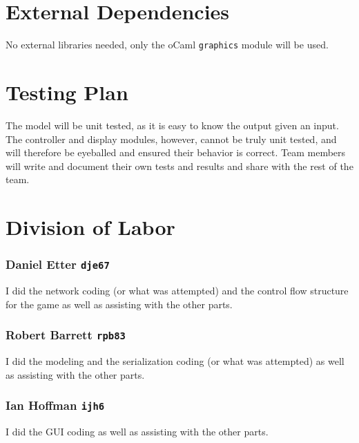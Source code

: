 \documentclass[10pt]{article}
\begin{document}
\clearpage
\part*{External Dependencies}
No external libraries needed, only the oCaml \texttt{graphics} module will be used.

\part*{Testing Plan}
The model will be unit tested, as it is easy to know the output given an input. The controller and display modules, however, cannot be truly unit tested, and will therefore be eyeballed and ensured their behavior is correct. Team members will write and document their own tests and results and share with the rest of the team.

\part*{Division of Labor}
\section*{Daniel Etter \texttt{dje67}} I did the network coding (or what was attempted) and the control flow structure for the game as well as assisting with the other parts.
\section*{Robert Barrett \texttt{rpb83}} I did the modeling and the serialization coding (or what was attempted) as well as assisting with the other parts.
\section*{Ian Hoffman \texttt{ijh6}} I did the GUI coding as well as assisting with the other parts.
\end{document}
